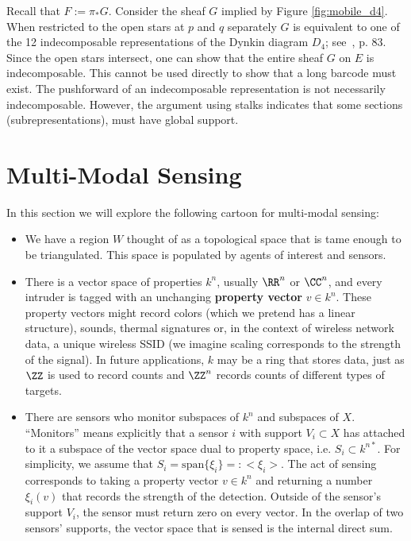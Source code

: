 \begin{rmk}
	Recall that $F:=\pi_* G$. Consider the sheaf $G$ implied by Figure \ref{fig:mobile_d4}. When restricted to the open stars at $p$ and $q$ separately $G$ is equivalent to one of the 12 indecomposable representations of the Dynkin diagram $D_4$; see~\cite{etingof_rep}, p. 83. Since the open stars intersect, one can show that the entire sheaf $G$ on $E$ is indecomposable. This cannot be used directly to show that a long barcode must exist. The pushforward of an indecomposable representation is not necessarily indecomposable. However, the argument using stalks indicates that some sections (subrepresentations), must have global support.
\end{rmk}

\section{Multi-Modal Sensing}
\label{subsec:multi_modal}

In this section we will explore the following cartoon for multi-modal sensing:

\begin{itemize}
	\item We have a region $W$ thought of as a topological space that is tame enough to be triangulated. This space is populated by agents of interest and sensors.
	\item There is a vector space of properties $k^n$, usually $\RR^n$ or $\CC^n$, and every intruder is tagged with an unchanging \textbf{property vector} $v\in k^n$. These property vectors might record colors (which we pretend has a linear structure), sounds, thermal signatures or, in the context of wireless network data, a unique wireless SSID (we imagine scaling corresponds to the strength of the signal). In future applications, $k$ may be a ring that stores data, just as $\ZZ$ is used to record counts and $\ZZ^n$ records counts of different types of targets.
	\item There are sensors who monitor subspaces of $k^n$ and subspaces of $X$. ``Monitors'' means explicitly that a sensor $i$ with support $V_i\subset X$ has attached to it a subspace of the vector space dual to property space, i.e. $S_i\subset k^{n*}$. For simplicity, we assume that $S_i=\mathrm{span}\{\xi_i\}=:<\xi_i>$. The act of sensing corresponds to taking a property vector $v\in k^n$ and returning a number $\xi_i(v)$ that records the strength of the detection. Outside of the sensor's support $V_i$, the sensor must return zero on every vector. In the overlap of two sensors' supports, the vector space that is sensed is the internal direct sum.
\end{itemize}

